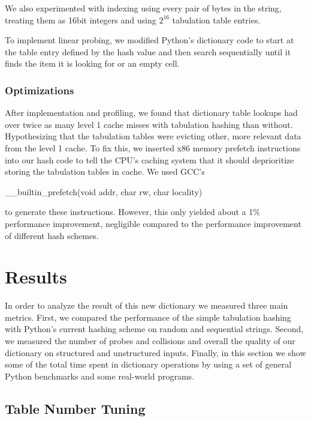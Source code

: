 \documentclass[11pt]{article}
\begin{document}
We also experimented with indexing using every pair of bytes in the string,
treating them as 16bit integers and
using $2^{16}$ tabulation table entries.

To implement linear probing, we modified Python's dictionary code to start at
the table entry defined by the hash value and then search sequentially until it
finds the item it is looking for or an empty cell.
\subsubsection{Optimizations}

After implementation and profiling, we found that dictionary table lookups had
over twice as many level 1 cache misses with tabulation hashing than without.
Hypothesizing that the tabulation tables were evicting other, more relevant
data from the level 1 cache.  To fix this, we inserted x86 memory prefetch
instructions into our hash code to tell the CPU's caching system that it should
deprioritize storing the tabulation tables in cache.  We used GCC's
\begin{tt}\_\_builtin\_prefetch(void \*addr, char rw, char locality)\end{tt}
to generate these instructions.  However, this only yielded about a 1\% performance improvement,
negligible compared to the performance improvement of different hash schemes.

\section{Results}

In order to analyze the result of this new dictionary we measured three main
metrics. First, we compared the performance of the simple tabulation hashing
with Python’s current hashing scheme on random and sequential strings. Second, we measured the number of probes and collisions and overall the quality of our dictionary on structured and unstructured inputs. Finally, in this section  we show some of the total time spent in dictionary operations by using a set of general Python benchmarks and some real-world programs.
\subsection{Table Number Tuning}
\end{document}
